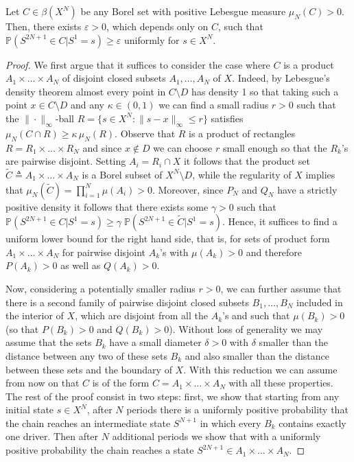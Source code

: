 \documentclass[10pt,a4paper]{amsart}
\newcommand{\PP}{\mathbb{P}}
\begin{document}
\begin{lemma}\label{Lemma:TechnicalAppendix}
    Let $C\in \beta(X^N)$ be any  Borel set with  positive Lebesgue measure $\mu_N(C)>0$. Then, there exists $\varepsilon>0$, which depends only on $C$, such that  $\PP(S^{2N+1}\in C | S^1=s) \geq \varepsilon$ uniformly for  $s \in X^N$.
    
\end{lemma}

\begin{proof}
We first argue that it suffices to consider the case where $C$ is a product $A_1 \times \ldots \times A_N$ of disjoint closed subsets $A_1,\ldots,A_N$ of $X$.
Indeed, by Lebesgue's density theorem almost every point in $C\setminus D$ has density 1 so that taking such a point $x \in C\setminus D$ and any $\kappa\in (0,1)$ we can find a small radius $r>0$ such that the $\|\cdot\|_\infty$-ball $R=\{s\in X^N:\|s-x\|_\infty\leq r\}$ satisfies 
$\mu_N(C \cap R) \geq \kappa\, \mu_N(R)$. Observe that $R$ is a product of rectangles $R=R_1 \times \ldots \times R_N$ and since $x\not\in D$ we can choose $r$ small enough so that the $R_k$'s are pairwise disjoint.
Setting $A_i=R_i\cap X$ it follows that the product set $\tilde C\triangleq A_1\times\ldots\times A_N$ 
is a Borel subset of $X^N\setminus D$, while
 the regularity of $X$ implies that $\mu_N(\tilde C)=\prod_{i=1}^N\mu(A_i)>0$.
Moreover, since $P_N$ and $Q_N$ have a strictly positive density it follows that  there exists some $\gamma>0$
such that
$\PP(S^{2N+1} \in C | S^1=s)\geq \gamma\; \PP(S^{2N+1} \in \tilde C | S^1=s)$. Hence, it suffices to find a uniform lower bound for the right hand side, that is,  for  sets  of product form $A_1\times\ldots\times A_N$
for pairwise disjoint $A_k$'s  with $\mu(A_k)>0$ and therefore $P(A_k)>0$ as well as $Q(A_k)>0$.

 Now, considering a potentially smaller radius $r>0$, we can further assume that there is a second family of pairwise disjoint closed subsets $B_1,\ldots,B_N$ included in the interior of $X$, which are disjoint from all the $A_k$'s and such that $\mu(B_k)>0$ (so that
$P(B_k)>0$ and $Q(B_k)>0$). Without loss of generality we may assume that the sets $B_k$ have a small diameter $\delta>0$ with $\delta$  smaller than the distance between any two of these sets $B_k$ and also smaller than the distance between these sets and  the boundary of $X$.
With this reduction we can assume from now on that $C$ is of the form $C=A_1 \times \ldots \times A_N$ with all these properties.
The rest of the proof consist in two steps: first, we show that starting from any initial state $s\in X^N$, after $N$ periods there is a uniformly positive probability that the chain reaches an intermediate state $S^{N+1}$ in which every $B_k$ contains exactly one driver. Then after $N$ additional periods we show that with a uniformly positive probability the chain reaches a state 
$S^{2N+1}\in A_1\times\ldots\times A_N$.


\end{proof}
\end{document}
